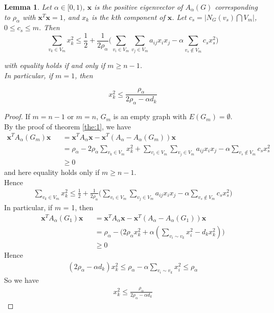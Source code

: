 \documentclass[amsthm]{elsart}
\newtheorem{lemma}{Lemma}[section]
\begin{document}
\begin{lemma}
Let $\alpha \in [0, 1)$, $\textbf{x}$ is the positive eigenvector of $A_\alpha (G)$ corresponding to $\rho _\alpha$ with $\textbf{x}^T \textbf{x} = 1$, and $x_k$ is the $k$th component of $\textbf{x}$. Let $ c_s = |N_G(v_s) \bigcap V_m|$,  $0 \leqslant c_s \leqslant m$. Then
\begin{equation} \label{equ:11}
\sum \limits_{v_k \in V_m}^{} x_k^2
\leqslant \frac{1}{2} + \frac{1}{2 \rho_\alpha} \Big( \sum \limits_{v_i \in V_m}^{} \sum \limits_{v_j \in V_m}^{} a_{ij} x_i x_j - \alpha \sum \limits_{v_s \notin V_m}^{} c_s x_s^2 \Big)
\end{equation}

with equality holds if and only if $m \geqslant n - 1$.
\\ In particular, if $m = 1$, then

\begin{equation} \label{equ:12}
 x_k^2 \leqslant \frac{\rho_\alpha}{2 \rho_\alpha - \alpha d_k}
\end{equation}
\end{lemma}
\begin{proof}
If $m = n - 1$ or $m = n$, $G_m$ is an empty graph with $E(G_m) = \emptyset$.
\\ By the proof of theorem \ref{the:1}, we have
\begin{eqnarray*}
\textbf{x}^T A_\alpha(G_m) \textbf{x}
&&= \textbf{x}^T A_\alpha \textbf{x} - \textbf{x}^T(A_\alpha - A_\alpha(G_m))\textbf{x}
\\ &&= \rho_\alpha
   - 2 \rho_\alpha \sum \limits_{v_k \in V_m}^{} x_k^2
   + \sum \limits_{v_i \in V_m}^{} \sum \limits_{v_j \in V_m}^{} a_{ij} x_i x_j
   - \alpha \sum \limits_{v_s \notin V_m}^{} c_s x_s^2
\\ &&\geqslant 0
\end{eqnarray*}
and here equality holds only if $m \geqslant n - 1$.
\\ Hence
\begin{eqnarray*}
\sum \limits_{v_k \in V_m}^{} x_k^2
\leqslant \frac{1}{2} + \frac{1}{2 \rho_\alpha} \Big( \sum \limits_{v_i \in V_m}^{} \sum \limits_{v_j \in V_m}^{} a_{ij} x_i x_j - \alpha \sum \limits_{v_s \notin V_m}^{} c_s x_s^2 \Big)
\end{eqnarray*}
In particular, if $m$ = 1, then
\begin{eqnarray*}
\textbf{x}^T A_\alpha(G_1) \textbf{x}
&&= \textbf{x}^T A_\alpha \textbf{x} - \textbf{x}^T(A_\alpha - A_\alpha(G_1))\textbf{x}
\\ &&= \rho_\alpha - \Big( 2 \rho_\alpha x_k^2 + \alpha (\sum \limits_{v_i \sim v_k}^{} x_i^2 - d_k x_k^2 )\Big)
\\ &&\geqslant 0
\end{eqnarray*}
Hence
\begin{eqnarray*}
(2 \rho_\alpha - \alpha d_k ) x_k^2
\leqslant \rho_\alpha - \alpha \sum \limits_{v_i \sim v_k}^{} x_i^2
\leqslant \rho_\alpha
\end{eqnarray*}
So we have
\begin{eqnarray*}
x_k^2 \leqslant \frac{\rho_\alpha} {2 \rho_\alpha - \alpha d_k}
\end{eqnarray*}
\end{proof}
\end{document}
